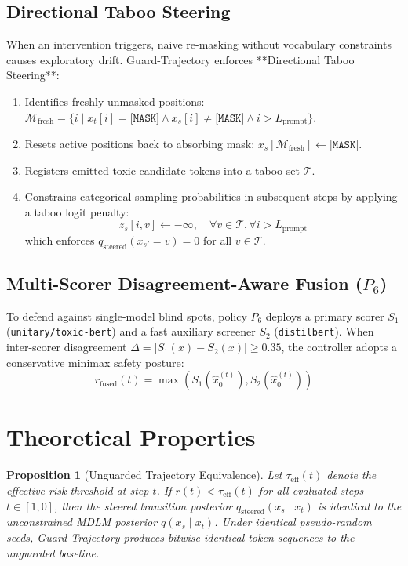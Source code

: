 \documentclass[conference]{IEEEtran}
\newtheorem{proposition}{Proposition}
\begin{document}
\subsection{Directional Taboo Steering}
When an intervention triggers, naive re-masking without vocabulary constraints causes exploratory drift. Guard-Trajectory enforces **Directional Taboo Steering**:
\begin{enumerate}
    \item Identifies freshly unmasked positions: $\mathcal{M}_{\text{fresh}} = \{ i \mid x_t[i] = \texttt{[MASK]} \land x_s[i] \ne \texttt{[MASK]} \land i > L_{\text{prompt}} \}$.
    \item Resets active positions back to absorbing mask: $x_s[\mathcal{M}_{\text{fresh}}] \leftarrow \texttt{[MASK]}$.
    \item Registers emitted toxic candidate tokens into a taboo set $\mathcal{T}$.
    \item Constrains categorical sampling probabilities in subsequent steps by applying a taboo logit penalty:
    \begin{equation}
        z_s[i, v] \leftarrow -\infty, \quad \forall v \in \mathcal{T}, \forall i > L_{\text{prompt}}
    \end{equation}
    which enforces $q_{\text{steered}}(x_{s'} = v) = 0$ for all $v \in \mathcal{T}$.
\end{enumerate}

\subsection{Multi-Scorer Disagreement-Aware Fusion ($P_6$)}
To defend against single-model blind spots, policy $P_6$ deploys a primary scorer $S_1$ (\texttt{unitary/toxic-bert}) and a fast auxiliary screener $S_2$ (\texttt{distilbert}). When inter-scorer disagreement $\Delta = |S_1(x) - S_2(x)| \ge 0.35$, the controller adopts a conservative minimax safety posture:
\begin{equation}
    r_{\text{fused}}(t) = \max(S_1(\hat{x}_0^{(t)}), S_2(\hat{x}_0^{(t)}))
\end{equation}

\section{Theoretical Properties}
\begin{proposition}[Unguarded Trajectory Equivalence]
Let $\tau_{\text{eff}}(t)$ denote the effective risk threshold at step $t$. If $r(t) < \tau_{\text{eff}}(t)$ for all evaluated steps $t \in [1, 0]$, then the steered transition posterior $q_{\text{steered}}(x_s \mid x_t)$ is identical to the unconstrained MDLM posterior $q(x_s \mid x_t)$. Under identical pseudo-random seeds, Guard-Trajectory produces bitwise-identical token sequences to the unguarded baseline.
\end{proposition}
\end{document}
